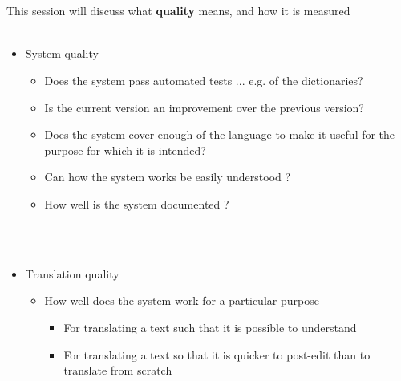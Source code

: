 \documentclass[10pt,xetex]{beamer} %
\date{2nd--13th November, 2015}
\title{\cyrtext{Session 7: Data consistency and quality}} %
\begin{document}
\begin{frame}
        \titlepage
\MyLogoBottomCentred
\end{frame}



\section{}


\begin{frame} %
 \begin{center}
 {\Large {\bf {}}} %
 \end{center}
\end{frame}

\begin{frame}
  \frametitle{}%

This session will discuss what \textbf{quality} means, and how it is measured \\

~\\

\begin{itemize}
  \item System quality
  \begin{itemize}

     \item Does the system pass automated tests ... e.g. of the dictionaries?
     \item Is the current version an improvement over the previous version?
     \item Does the system cover enough of the language to make it useful for the purpose for which it is intended?
     \item Can how the system works be easily understood ?
     \item How well is the system documented ? 
  \end{itemize}
~\\
~\\ 
  \item Translation quality
  \begin{itemize}

    \item How well does the system work for a particular purpose
    \begin{itemize}
      \item For translating a text such that it is possible to understand
      \item For translating a text so that it is quicker to post-edit than to translate from scratch
    \end{itemize}
  \end{itemize}
\end{itemize}

\end{frame}
\end{document}

